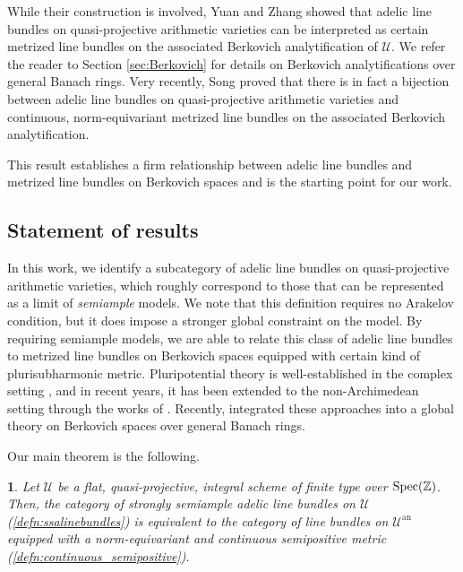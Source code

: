 \documentclass[11pt,reqno]{amsart}
\newcommand{\mZ}{\mathbb{Z}}
\newcommand{\cU}{\mathcal{U}}
\theoremstyle{theorem}
\numberwithin{equation}{subsection}
\newtheorem{thmx}{\text{Theorem}}
\numberwithin{equation}{subsection}
\theoremstyle{definition}
\theoremstyle{remark}
\numberwithin{equation}{subsubsection} \numberwithin{figure}{section}
\DeclareMathOperator{\an}{an}
\begin{document}
While their construction is involved, Yuan and Zhang \cite[Section 3.4]{YuanZhang:AdelicLineBundles} showed that adelic line bundles on quasi-projective arithmetic varieties can be interpreted as certain metrized line bundles on the associated Berkovich analytification of $\cU$. 
We refer the reader to Section \ref{sec:Berkovich} for details on Berkovich analytifications over general Banach rings. 
Very recently, Song \cite{Song:EquivariantAdelic} proved that there is in fact a bijection between adelic line bundles on quasi-projective arithmetic varieties and continuous, norm-equivariant metrized line bundles on the associated Berkovich analytification. 


This result establishes a firm relationship between adelic line bundles and metrized line bundles on Berkovich spaces and is the starting point for our work. 


\subsection*{Statement of results}
In this work, we identify a subcategory of adelic line bundles on quasi-projective arithmetic varieties, which roughly correspond to those that can be represented as a limit of \textit{semiample} models. 
We note that this definition requires no Arakelov condition, but it does impose a stronger global constraint on the model. 
By requiring semiample models, we are able to relate this class of adelic line bundles to metrized line bundles on Berkovich spaces equipped with certain kind of plurisubharmonic metric. 
Pluripotential theory is well-established in the complex setting \cite{BedforTaylor:CapacityPSH, Demailly:Regularization}, and in recent years, it has been extended to the non-Archimedean setting through the works of \cite{thuillier2005theorie, BakerRumley:PotentialTheory, BouksomFJ:SingularSemiPositive, BoucksomJonsson:SingularPSH}. 
Recently, \cite{PilleSchneider:Global} integrated these approaches into a global theory on Berkovich spaces over general Banach rings. 


Our main theorem is the following. 

\begin{thmx}\label{thmx:main0}
Let $\cU$ be a flat, quasi-projective, integral scheme of finite type over $\Spec(\mZ)$. 
Then, the category of strongly semiample adelic line bundles on $\cU$ (\autoref{defn:ssalinebundles}) is equivalent to the category of line bundles on $\cU^{\an}$ equipped with a norm-equivariant and continuous semipositive metric (\autoref{defn:continuous_semipositive}). 
\end{thmx}
\end{document}
